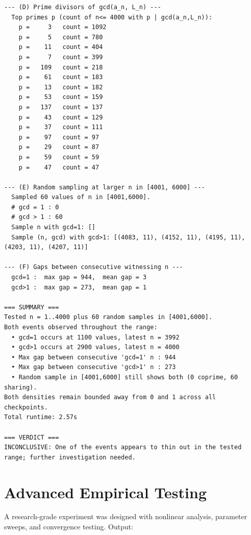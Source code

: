 \documentclass[11pt]{article}
\begin{document}
\begin{lstlisting}
--- (D) Prime divisors of gcd(a_n, L_n) ---
  Top primes p (count of n<= 4000 with p | gcd(a_n,L_n)):
    p =     3   count = 1092
    p =     5   count = 780
    p =    11   count = 404
    p =     7   count = 399
    p =   109   count = 218
    p =    61   count = 183
    p =    13   count = 182
    p =    53   count = 159
    p =   137   count = 137
    p =    43   count = 129
    p =    37   count = 111
    p =    97   count = 97
    p =    29   count = 87
    p =    59   count = 59
    p =    47   count = 47

--- (E) Random sampling at larger n in [4001, 6000] ---
  Sampled 60 values of n in [4001,6000].
  # gcd = 1 : 0
  # gcd > 1 : 60
  Sample n with gcd=1: []
  Sample (n, gcd) with gcd>1: [(4083, 11), (4152, 11), (4195, 11), (4203, 11), (4207, 11)]

--- (F) Gaps between consecutive witnessing n ---
  gcd=1 :  max gap = 944,  mean gap = 3
  gcd>1 :  max gap = 273,  mean gap = 1

=== SUMMARY ===
Tested n = 1..4000 plus 60 random samples in [4001,6000].
Both events observed throughout the range:
  • gcd=1 occurs at 1100 values, latest n = 3992
  • gcd>1 occurs at 2900 values, latest n = 4000
  • Max gap between consecutive 'gcd=1' n : 944
  • Max gap between consecutive 'gcd>1' n : 273
  • Random sample in [4001,6000] still shows both (0 coprime, 60 sharing).
Both densities remain bounded away from 0 and 1 across all checkpoints.
Total runtime: 2.57s

=== VERDICT ===
INCONCLUSIVE: One of the events appears to thin out in the tested range; further investigation needed.

\end{lstlisting}


\section{Advanced Empirical Testing}

A research-grade experiment was designed with nonlinear analysis, parameter sweeps,
and convergence testing. Output:
\end{document}
